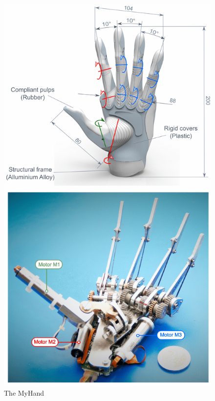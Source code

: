 \documentclass[a4paper, 10pt, conference]{ieeeconf}      %
\begin{document}
\begin{figure}[h]

	\centering
	\includegraphics[scale=0.25]{images/MyHand}
	
	\caption{The MyHand}
\end{figure}
\end{document}
